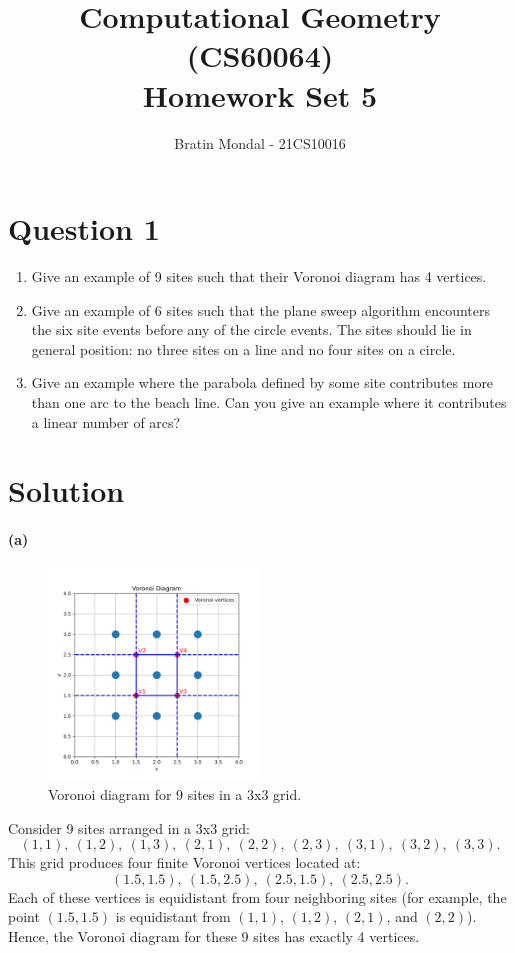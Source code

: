 \documentclass[12pt]{article}
\title{Computational Geometry (CS60064)\\ Homework Set 5}
\author{
    Bratin Mondal - 21CS10016
}
\date{}
\begin{document}
\maketitle

\section*{Question 1}
\begin{enumerate}[label=(\alph*)]
    \item Give an example of 9 sites such that their Voronoi diagram has 4 vertices.
    \item Give an example of 6 sites such that the plane sweep algorithm encounters the six site events before any of the circle events. The sites should lie in general position: no three sites on a line and no four sites on a circle.
    \item Give an example where the parabola defined by some site contributes more than one arc to the beach line. Can you give an example where it contributes a linear number of arcs?
\end{enumerate}

\section*{Solution}
\paragraph{(a)}

\begin{figure}[H]
    \centering
    \includegraphics[width=0.5\textwidth]{img/1a.png}
    \caption{Voronoi diagram for 9 sites in a 3x3 grid.}
    \label{fig:voronoi_3x3}
\end{figure}
Consider 9 sites arranged in a 3x3 grid:
\[
(1,1),\ (1,2),\ (1,3),\ (2,1),\ (2,2),\ (2,3),\ (3,1),\ (3,2),\ (3,3).
\]
This grid produces four finite Voronoi vertices located at:
\[
(1.5, 1.5),\ (1.5, 2.5),\ (2.5, 1.5),\ (2.5, 2.5).
\]
Each of these vertices is equidistant from four neighboring sites (for example, the point \((1.5, 1.5)\) is equidistant from \((1,1)\), \((1,2)\), \((2,1)\), and \((2,2)\)). Hence, the Voronoi diagram for these 9 sites has exactly 4 vertices.
\end{document}
